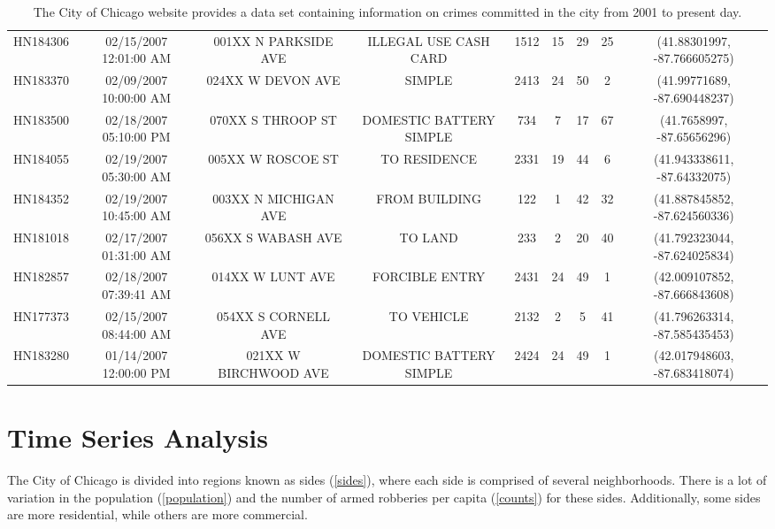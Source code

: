 \documentclass{article} %
\begin{document}
\begin{table}[h]
\begin{adjustbox}{width=\textwidth}
\begin{tabular}{ccccccccc}
  HN184306 & 02/15/2007 12:01:00 AM & 001XX N PARKSIDE AVE & ILLEGAL USE CASH CARD & 1512 &  15 &  29 &  25 & (41.88301997, -87.766605275) \\ 
  HN183370 & 02/09/2007 10:00:00 AM & 024XX W DEVON AVE & SIMPLE & 2413 &  24 &  50 &   2 & (41.99771689, -87.690448237) \\ 
  HN183500 & 02/18/2007 05:10:00 PM & 070XX S THROOP ST & DOMESTIC BATTERY SIMPLE & 734 &   7 &  17 &  67 & (41.7658997, -87.65656296) \\ 
  HN184055 & 02/19/2007 05:30:00 AM & 005XX W ROSCOE ST & TO RESIDENCE & 2331 &  19 &  44 &   6 & (41.943338611, -87.64332075) \\ 
  HN184352 & 02/19/2007 10:45:00 AM & 003XX N MICHIGAN AVE & FROM BUILDING & 122 &   1 &  42 &  32 & (41.887845852, -87.624560336) \\ 
  HN181018 & 02/17/2007 01:31:00 AM & 056XX S WABASH AVE & TO LAND & 233 &   2 &  20 &  40 & (41.792323044, -87.624025834) \\ 
  HN182857 & 02/18/2007 07:39:41 AM & 014XX W LUNT AVE & FORCIBLE ENTRY & 2431 &  24 &  49 &   1 & (42.009107852, -87.666843608) \\ 
  HN177373 & 02/15/2007 08:44:00 AM & 054XX S CORNELL AVE & TO VEHICLE & 2132 &   2 &   5 &  41 & (41.796263314, -87.585435453) \\ 
  HN183280 & 01/14/2007 12:00:00 PM & 021XX W BIRCHWOOD AVE & DOMESTIC BATTERY SIMPLE & 2424 &  24 &  49 &   1 & (42.017948603, -87.683418074) \\ 
   \hline
\end{tabular}
\end{adjustbox}
\caption{The City of Chicago website provides a data set containing information on crimes committed in the city from 2001 to present day.}
\label{data}
\end{table}



\section{Time Series Analysis}


\noindent The City of Chicago is divided into regions known as sides (\autoref{sides}), where each side is comprised of several neighborhoods. There is a lot of variation in the population (\autoref{population}) and the number of armed robberies per capita (\autoref{counts}) for these sides.  Additionally, some sides are more residential, while others are more commercial.\newline
 
\end{document}
